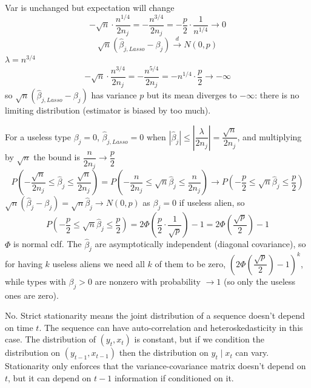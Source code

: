 \documentclass[11pt]{article}
\begin{document}
Var is unchanged but expectation will change
\[
-\sqrt n\cdot\frac{n^{1/4}}{2n_j}=-\frac{n^{3/4}}{2n_j}=-\frac p2\cdot\frac1{n^{1/4}}\to0
\]
\[
\sqrt n(\hat\beta_{j,Lasso}-\beta_j)\xrightarrow{d}N(0,p)
\]
$\lambda=n^{3/4}$
\[
-\sqrt n\cdot\frac{n^{3/4}}{2n_j}=-\frac{n^{5/4}}{2n_j}=-n^{1/4}\cdot\frac p2\to-\infty
\]
so $\sqrt n(\hat\beta_{j,Lasso}-\beta_j)$ has variance $p$ but its mean diverges to $-\infty$: there is no limiting distribution (estimator is biased by too much).

For a useless type $\beta_j=0$, $\hat\beta_{j,Lasso}=0$ when $|\hat\beta_j|\le\left|\dfrac{\lambda}{2n_j}\right|=\dfrac{\sqrt n}{2n_j}$, and multiplying by $\sqrt n$ the bound is $\dfrac{n}{2n_j}\to\dfrac p2$
\[
P\!\left(-\frac{\sqrt n}{2n_j}\le\hat\beta_j\le\frac{\sqrt n}{2n_j}\right)=P\!\left(-\frac{n}{2n_j}\le\sqrt n\hat\beta_j\le\frac{n}{2n_j}\right)\to P\!\left(-\frac p2\le\sqrt n\hat\beta_j\le\frac p2\right)
\]
$\sqrt n(\hat\beta_j-\beta_j)=\sqrt n\hat\beta_j\to N(0,p)$ as $\beta_j=0$ if useless alien, so
\[
P\!\left(-\frac p2\le\sqrt n\hat\beta_j\le\frac p2\right)=2\Phi\!\left(\frac p2\cdot\frac1{\sqrt p}\right)-1=2\Phi\!\left(\frac{\sqrt p}{2}\right)-1
\]
$\Phi$ is normal cdf. The $\hat\beta_j$ are asymptotically independent (diagonal covariance), so for having $k$ useless aliens we need all $k$ of them to be zero, $\left(2\Phi\!\left(\dfrac{\sqrt p}{2}\right)-1\right)^k$, while types with $\beta_j>0$ are nonzero with probability $\to1$ (so only the useless ones are zero).


No. Strict stationarity means the joint distribution of a sequence doesn't depend on time $t$. The sequence can have auto-correlation and heteroskedasticity in this case. The distribution of $(y_t,x_t)$ is constant, but if we condition the distribution on $(y_{t-1},x_{t-1})$ then the distribution on $y_t\mid x_t$ can vary. Stationarity only enforces that the variance-covariance matrix doesn't depend on $t$, but it can depend on $t-1$ information if conditioned on it.
\end{document}
